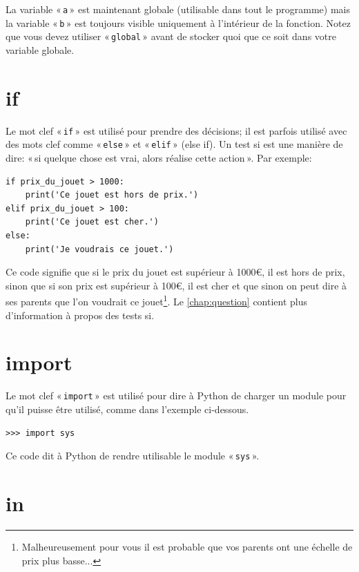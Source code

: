 La variable « \texttt{a} » est maintenant globale (utilisable dans tout le programme) mais la variable « \texttt{b} » est toujours visible uniquement à l'intérieur de la fonction. Notez que vous devez utiliser « \texttt{global} » avant de stocker quoi que ce soit dans votre variable globale.

\section*{if}

Le mot clef « \texttt{if} » est utilisé pour prendre des décisions; il est parfois utilisé avec des mots clef comme « \texttt{else} » et « \texttt{elif} » (else if). Un test si est une manière de dire: « si quelque chose est vrai, alors réalise cette action ». Par exemple:

\begin{Verbatim}[frame=single,rulecolor=\color{gray}]
if prix_du_jouet > 1000:
    print('Ce jouet est hors de prix.')
elif prix_du_jouet > 100:
    print('Ce jouet est cher.')
else:
    print('Je voudrais ce jouet.')
\end{Verbatim}

Ce code signifie que si le prix du jouet est supérieur à 1000{€}, il est hors de prix, sinon que si son prix est supérieur à 100{€}, il est cher et que sinon on peut dire à ses parents que l'on voudrait ce jouet\footnote{Malheureusement  pour vous il est probable que vos parents ont une échelle de prix plus basse...}.  Le \autoref{chap:question} contient plus d'information à propos des tests si.

\section*{import}
Le mot clef « \texttt{import} »  est utilisé pour dire à Python de charger un module pour qu'il puisse être utilisé, comme dans l'exemple ci-dessous.


\begin{Verbatim}[frame=single,rulecolor=\color{gray}]
>>> import sys
\end{Verbatim}

Ce code dit à Python de rendre utilisable le module « \texttt{sys} ».

\section*{in}

